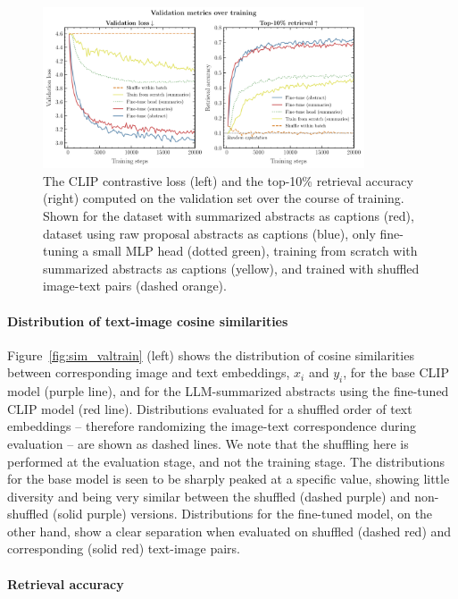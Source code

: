 \documentclass{article} %
\begin{document}
   \begin{figure}[!h]
   \centering
   \includegraphics[width=0.85\textwidth]{plots/val_metrics.pdf}
   \caption{The CLIP contrastive loss (left) and the top-10\% retrieval accuracy (right) computed on the validation set over the course of training. Shown for the dataset with summarized abstracts as captions (red), dataset using raw proposal abstracts as captions (blue), only fine-tuning a small MLP head (dotted green), training from scratch with summarized abstracts as captions (yellow), and trained with shuffled image-text pairs (dashed orange).} 
   \label{fig:retrieval_acc}
   \end{figure}
   
   \paragraph*{Distribution of text-image cosine similarities}
   
   Figure~\ref{fig:sim_valtrain} (left) shows the distribution of cosine similarities between corresponding image and text embeddings, $x_i$ and $y_i$, for the base CLIP model (purple line), and for the LLM-summarized abstracts using the fine-tuned CLIP model (red line).
   Distributions evaluated for a shuffled order of text embeddings -- therefore randomizing the image-text correspondence during evaluation -- are shown as dashed lines. We note that the shuffling here is performed at the evaluation stage, and not the training stage.
   The distributions for the base model is seen to be sharply peaked at a specific value, showing little diversity and being very similar between the shuffled (dashed purple) and non-shuffled (solid purple) versions. 
   Distributions for the fine-tuned model, on the other hand, show a clear separation when evaluated on shuffled (dashed red) and corresponding (solid red) text-image pairs.
   
   \paragraph*{Retrieval accuracy}
   
\end{document}
